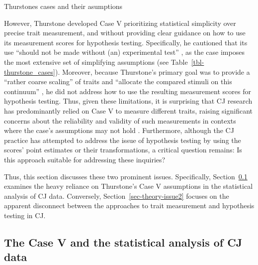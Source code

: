 \documentclass[
  authoryear,
  review,
  1p]{elsarticle}
\begin{document}
\begin{table}

\caption{\label{tbl-thurstone_cases}Thurstones cases and their
asumptions}


\end{table}%

However, Thurstone developed Case V prioritizing statistical simplicity
over precise trait measurement, and without providing clear guidance on
how to use its measurement scores for hypothesis testing. Specifically,
he cautioned that its use ``should not be made without (an) experimental
test'' \citep[pp.~270]{Thurstone_1927b}, as the case imposes the most
extensive set of simplifying assumptions
\citep{Bramley_2008, Kelly_et_al_2022} (see
Table~\ref{tbl-thurstone_cases}). Moreover, because Thurstone's primary
goal was to provide a ``rather coarse scaling'' of traits
\citep[pp.~269]{Thurstone_1927b} and ``allocate the compared stimuli on
this continuum'' \citep[pp.~269]{Thurstone_1927b}, he did not address
how to use the resulting measurement scores for hypothesis testing.
Thus, given these limitations, it is surprising that CJ research has
predominantly relied on Case V to measure different traits, raising
significant concerns about the reliability and validity of such
measurements in contexts where the case's assumptions may not hold
\citep{Kelly_et_al_2022, Andrich_1978}. Furthermore, although the CJ
practice has attempted to address the issue of hypothesis testing by
using the scores' point estimates or their transformations, a critical
question remains: Is this approach suitable for addressing these
inquiries?

Thus, this section discusses these two prominent issues. Specifically,
Section~\ref{sec-theory-issue1} examines the heavy reliance on
Thurstone's Case V assumptions in the statistical analysis of CJ data.
Conversely, Section~\ref{sec-theory-issue2} focuses on the apparent
disconnect between the approaches to trait measurement and hypothesis
testing in CJ.

\subsection{The Case V and the statistical analysis of CJ
data}\label{sec-theory-issue1}
\end{document}
